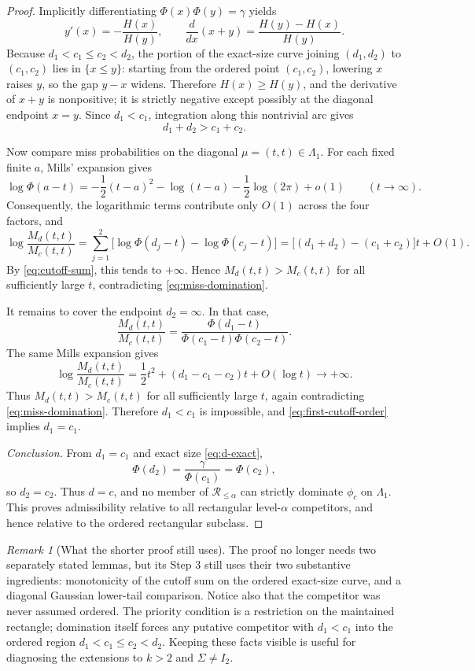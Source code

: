 \documentclass[12pt]{article}
\theoremstyle{definition}
\theoremstyle{remark}
\newtheorem{remark}{Remark}
\newcommand{\phitest}{\phi}
\newcommand{\gammalev}{\gamma}
\begin{document}
\begin{proof}
Implicitly differentiating $\Phi(x)\Phi(y)=\gammalev$ yields
\[
y'(x)=-\frac{H(x)}{H(y)},
\qquad
\frac{d}{dx}(x+y)=\frac{H(y)-H(x)}{H(y)}.
\]
Because $d_1<c_1\le c_2<d_2$, the portion of the exact-size curve joining $(d_1,d_2)$ to $(c_1,c_2)$ lies in $\{x\le y\}$: starting from the ordered point $(c_1,c_2)$, lowering $x$ raises $y$, so the gap $y-x$ widens. Therefore $H(x)\ge H(y)$, and the derivative of $x+y$ is nonpositive; it is strictly negative except possibly at the diagonal endpoint $x=y$. Since $d_1<c_1$, integration along this nontrivial arc gives
\begin{equation}\label{eq:cutoff-sum}
d_1+d_2>c_1+c_2.
\end{equation}

Now compare miss probabilities on the diagonal $\mu=(t,t)\in\Lambda_1$. For each fixed finite $a$, Mills' expansion gives
\[
\log\Phi(a-t)
=-\frac12(t-a)^2-\log(t-a)-\frac12\log(2\pi)+o(1)
\qquad (t\to\infty).
\]
Consequently, the logarithmic terms contribute only $O(1)$ across the four factors, and
\[
\log\frac{M_d(t,t)}{M_c(t,t)}
=
\sum_{j=1}^{2}\bigl[\log\Phi(d_j-t)-\log\Phi(c_j-t)\bigr]
=
\bigl[(d_1+d_2)-(c_1+c_2)\bigr]t+O(1).
\]
By \eqref{eq:cutoff-sum}, this tends to $+\infty$. Hence $M_d(t,t)>M_c(t,t)$ for all sufficiently large $t$, contradicting \eqref{eq:miss-domination}.

It remains to cover the endpoint $d_2=\infty$. In that case,
\[
\frac{M_d(t,t)}{M_c(t,t)}
=
\frac{\Phi(d_1-t)}{\Phi(c_1-t)\Phi(c_2-t)}.
\]
The same Mills expansion gives
\[
\log\frac{M_d(t,t)}{M_c(t,t)}
=
\frac12t^2+(d_1-c_1-c_2)t+O(\log t)
\longrightarrow +\infty.
\]
Thus $M_d(t,t)>M_c(t,t)$ for all sufficiently large $t$, again contradicting \eqref{eq:miss-domination}. Therefore $d_1<c_1$ is impossible, and \eqref{eq:first-cutoff-order} implies $d_1=c_1$.

\emph{Conclusion.}
From $d_1=c_1$ and exact size \eqref{eq:d-exact},
\[
\Phi(d_2)=\frac{\gammalev}{\Phi(c_1)}=\Phi(c_2),
\]
so $d_2=c_2$. Thus $d=c$, and no member of $\mathcal R_{\le\alpha}$ can strictly dominate $\phitest_c$ on $\Lambda_1$. This proves admissibility relative to all rectangular level-$\alpha$ competitors, and hence relative to the ordered rectangular subclass.
\end{proof}

\begin{remark}[What the shorter proof still uses]\label{rem:two-ingredients}
The proof no longer needs two separately stated lemmas, but its Step 3 still uses their two substantive ingredients: monotonicity of the cutoff sum on the ordered exact-size curve, and a diagonal Gaussian lower-tail comparison. Notice also that the competitor was never assumed ordered. The priority condition is a restriction on the maintained rectangle; domination itself forces any putative competitor with $d_1<c_1$ into the ordered region $d_1<c_1\le c_2<d_2$. Keeping these facts visible is useful for diagnosing the extensions to $k>2$ and $\Sigma\ne I_2$.
\end{remark}
\end{document}
